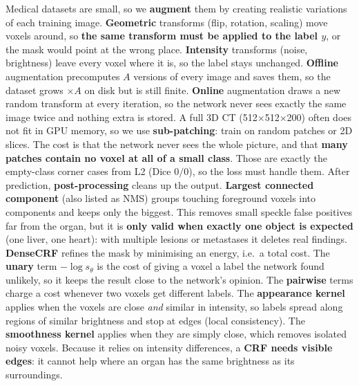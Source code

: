 \documentclass[a4paper]{article}
\newcommand{\K}[1]{\textcolor{kg}{\textbf{#1}}}
\newcommand{\F}[1]{\textcolor{fb}{#1}}
\newcommand{\E}[1]{\textcolor{ep}{#1}}
\newcommand{\T}[1]{\textcolor{tr}{\textbf{#1}}}
\begin{document}
Medical datasets are small, so we \K{augment} them by creating realistic variations of each training image. \K{Geometric} transforms (flip, rotation, scaling) move voxels around, so \T{the same transform must be applied to the label $y$}, or the mask would point at the wrong place. \K{Intensity} transforms (noise, brightness) leave every voxel where it is, so the label stays unchanged.
\K{Offline} augmentation precomputes $A$ versions of every image and saves them, so the dataset grows $\times A$ on disk but is still finite. \K{Online} augmentation draws a new random transform at every iteration, so the network never sees exactly the same image twice and nothing extra is stored. A full 3D CT (\E{512$\times$512$\times$200}) often does not fit in GPU memory, so we use \K{sub-patching}: train on random patches or 2D slices. The cost is that the network never sees the whole picture, and that \T{many patches contain no voxel at all of a small class}. Those are exactly the empty-class corner cases from L2 (Dice $0/0$), so the loss must handle them.
After prediction, \K{post-processing} cleans up the output. \K{Largest connected component} (also listed as NMS) groups touching foreground voxels into components and keeps only the biggest. This removes small speckle false positives far from the organ, but it is \T{only valid when exactly one object is expected} (\E{one liver, one heart}): with multiple lesions or metastases it deletes real findings.
\K{DenseCRF} refines the mask by minimising an energy, i.e.\ a total cost. The \K{unary} term \F{$-\log s_\theta$} is the cost of giving a voxel a label the network found unlikely, so it keeps the result close to the network's opinion. The \K{pairwise} terms charge a cost whenever two voxels get different labels. The \K{appearance kernel} applies when the voxels are close \emph{and} similar in intensity, so labels spread along regions of similar brightness and stop at edges (local consistency). The \K{smoothness kernel} applies when they are simply close, which removes isolated noisy voxels. Because it relies on intensity differences, a \T{CRF needs visible edges}: it cannot help where an organ has the same brightness as its surroundings.
\end{document}
